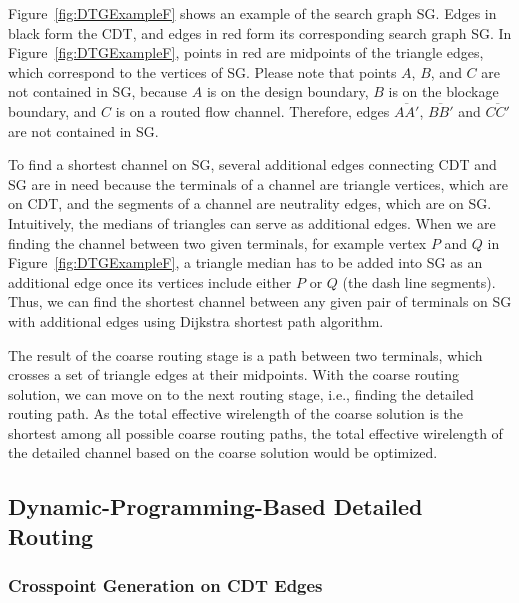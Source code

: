 \documentclass[journal]{IEEEtran}
\begin{document}
Figure~\ref{fig:DTGExampleF} shows an example of the search graph SG. 
Edges in black form the CDT, and edges in red form its corresponding search graph SG. 
In Figure~\ref{fig:DTGExampleF}, points in red are midpoints of the 
triangle edges, which correspond to the vertices of SG. 
Please note that points $A$, $B$, and $C$ are not contained in SG, 
because $A$ is on the design boundary, $B$ is on the blockage boundary, 
and $C$ is on a routed flow channel. Therefore, edges $\overline{AA'}$, 
$\overline{BB'}$ and $\overline{CC'}$ are not contained in SG. 


To find a shortest channel on SG, several 
additional edges connecting CDT and SG are in need because the terminals of a channel are 
triangle vertices, which are on CDT, and the segments of a channel are neutrality edges, 
which are on SG. 
Intuitively, the medians of triangles can serve as additional edges. 
When we are finding the channel between two given terminals, for example vertex $P$ and $Q$ in 
Figure~\ref{fig:DTGExampleF}, a triangle median has to be added into SG as an additional edge once its vertices include either $P$ or $Q$ (the dash line segments). Thus, we can find the shortest channel between any given pair of terminals on SG with additional edges using Dijkstra shortest path algorithm.

The result of the coarse routing stage is a path between two terminals,
 which crosses a set of triangle edges at their midpoints. 
 With the coarse routing solution, we can move on to the next routing stage, i.e., finding the detailed routing path. 
As the total effective wirelength of the coarse solution is the shortest among all possible coarse routing paths, the total effective wirelength of the detailed channel based on the coarse solution would be optimized.

\subsection{Dynamic-Programming-Based Detailed Routing}
\label{sec:dp}

\subsubsection{Crosspoint Generation on CDT Edges}
\end{document}
